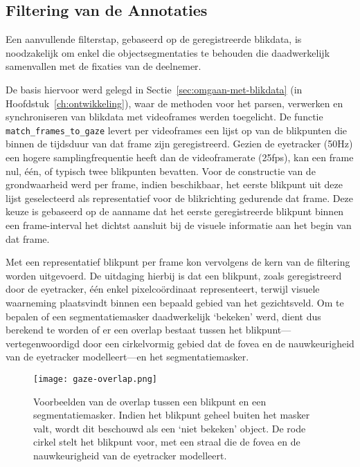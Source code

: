 \subsection{Filtering van de Annotaties}

Een aanvullende filterstap, gebaseerd op de geregistreerde blikdata, is noodzakelijk om enkel die objectsegmentaties 
te behouden die daadwerkelijk samenvallen met de fixaties van de deelnemer.

De basis hiervoor werd gelegd in Sectie~\ref{sec:omgaan-met-blikdata} (in Hoofdstuk~\ref{ch:ontwikkeling}), 
waar de methoden voor het parsen, verwerken en synchroniseren van blikdata met videoframes werden toegelicht. 
De functie \texttt{match\_frames\_to\_gaze} levert per videoframes een lijst op van de blikpunten die binnen de tijdsduur 
van dat frame zijn geregistreerd. 
Gezien de eyetracker (50Hz) een hogere samplingfrequentie heeft dan de videoframerate (25fps), 
kan een frame nul, één, of typisch twee blikpunten bevatten. 
Voor de constructie van de grondwaarheid werd per frame, indien beschikbaar, het eerste blikpunt uit deze lijst geselecteerd 
als representatief voor de blikrichting gedurende dat frame. 
Deze keuze is gebaseerd op de aanname dat het eerste geregistreerde blikpunt binnen een frame-interval 
het dichtst aansluit bij de visuele informatie aan het begin van dat frame.

Met een representatief blikpunt per frame kon vervolgens de kern van de filtering worden uitgevoerd. 
De uitdaging hierbij is dat een blikpunt, zoals geregistreerd door de eyetracker, één enkel pixelcoördinaat representeert, 
terwijl visuele waarneming plaatsvindt binnen een bepaald gebied van het gezichtsveld. 
Om te bepalen of een segmentatiemasker daadwerkelijk `bekeken' werd, dient dus berekend te worden of er een 
overlap bestaat tussen het blikpunt---vertegenwoordigd door een cirkelvormig gebied dat de fovea en de nauwkeurigheid van de eyetracker modelleert---en het segmentatiemasker.

\begin{figure}[H]
  \centering
  \texttt{[image: gaze-overlap.png]}
  \caption[]{\label{fig:gaze-overlap} 
    Voorbeelden van de overlap tussen een blikpunt en een segmentatiemasker.
    Indien het blikpunt geheel buiten het masker valt, wordt dit beschouwd als een `niet bekeken' object.
    De rode cirkel stelt het blikpunt voor, met een straal die de fovea en de nauwkeurigheid van de eyetracker modelleert.
  }
\end{figure}

